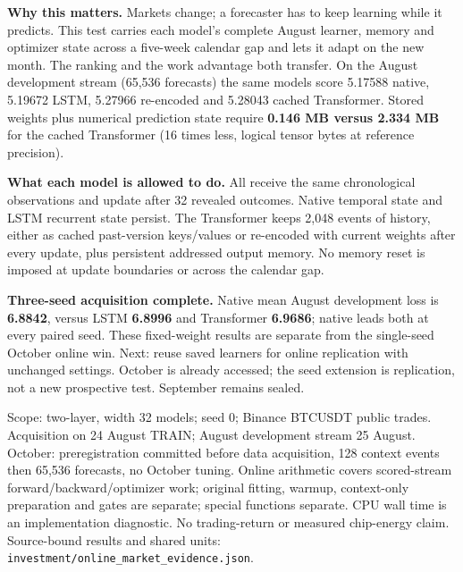 \documentclass[10pt, a4 paper]{article}
\newcommand{\sect}[2]{\vspace{2pt}{\color{ours}\footnotesize\bfseries\MakeUppercase{#1}}\par\vspace{-3pt}{\LARGE\bfseries #2}\par\vspace{2pt}}
\begin{document}
\textbf{Why this matters.} Markets change; a forecaster has to keep learning while
it predicts. This test carries each model's complete August learner, memory and
optimizer state across a five-week calendar gap and lets it adapt on the new month.
The ranking and the work advantage both transfer. On the August development stream
(65,536 forecasts) the same models score 5.17588 native, 5.19672 LSTM, 5.27966
re-encoded and 5.28043 cached Transformer. Stored weights plus numerical prediction
state require \textbf{0.146 MB versus 2.334 MB} for the cached Transformer (16 times
less, logical tensor bytes at reference precision).

\textbf{What each model is allowed to do.} All receive the same chronological
observations and update after 32 revealed outcomes. Native temporal state and
LSTM recurrent state persist. The Transformer keeps 2,048 events of history, either
as cached past-version keys/values or re-encoded with current weights after every
update, plus persistent addressed output memory. No memory reset is imposed at update
boundaries or across the calendar gap.

\textbf{Three-seed acquisition complete.} Native mean August development loss is \textbf{6.8842}, versus LSTM \textbf{6.8996} and Transformer \textbf{6.9686}; native leads both at every paired seed. These fixed-weight results are separate from the single-seed October online win. Next: reuse saved learners for online replication with unchanged settings. October is already accessed; the seed extension is replication, not a new prospective test. September remains sealed.

{\footnotesize\color{muted}Scope: two-layer, width 32 models; seed 0; Binance BTCUSDT public trades. Acquisition on 24 August TRAIN;
August development stream 25 August. October: preregistration committed before data acquisition, 128 context events
then 65,536 forecasts, no October tuning. Online arithmetic covers scored-stream forward/backward/optimizer work;
original fitting, warmup, context-only preparation and gates are separate; special functions separate.
CPU wall time is an implementation diagnostic. No trading-return or measured chip-energy claim. Source-bound results
and shared units: \\ \texttt{investment/online\_market\_evidence.json}.}

\newpage
\sect{Industrial fault detection}{A sealed win on interleaved factory logs}
\end{document}
